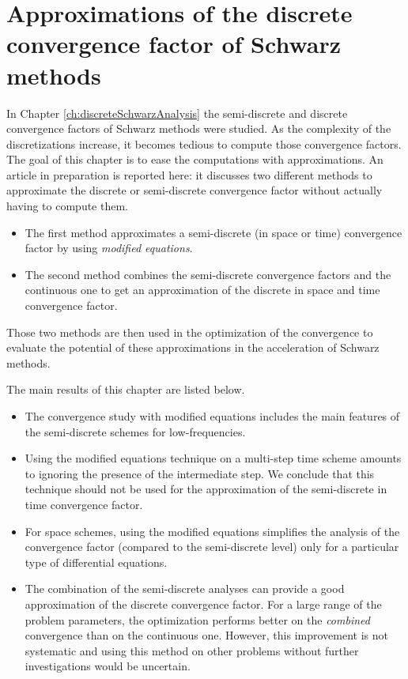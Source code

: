 \chapter{Approximations of the discrete convergence factor of Schwarz methods }
\label{ch:approximatedDiscreteSchwarz}
\minitoc
In Chapter \ref{ch:discreteSchwarzAnalysis} the semi-discrete and
discrete convergence factors of Schwarz methods were studied.
As the complexity of the discretizations increase, it becomes
tedious to compute those convergence factors.
The goal of this chapter
is to ease the computations with approximations.
An article in preparation is reported here:
it discusses two different methods to approximate the discrete
or semi-discrete convergence factor without actually having to
compute them.
\begin{itemize}
\item The first method approximates a semi-discrete
(in space or time) convergence factor by using
\textit{modified equations}.
\item The second method combines the semi-discrete convergence
factors and the continuous one to get an approximation of the
discrete in space and time convergence factor.
\end{itemize}
Those two methods are then used in the optimization of the
convergence to evaluate the potential of these approximations
in the acceleration of Schwarz methods.
\par
The main results of this chapter are listed below.
\begin{itemize}
\item The convergence study with modified equations
	includes the main features of the semi-discrete
		schemes for low-frequencies.
\item Using the modified equations technique
	on a multi-step time scheme amounts to ignoring
	the presence of the intermediate step. We conclude
	that this technique should not be used for
	the approximation of the semi-discrete in time
	convergence factor.
\item For space schemes, using the modified equations simplifies
	the analysis of the convergence factor
	(compared to the semi-discrete level) only
	for a particular type of differential equations.
\item The combination of the semi-discrete analyses can provide
	a good approximation of the discrete convergence factor.
	For a large range of the problem parameters,
	the optimization performs better on the \textit{combined}
	convergence than on the continuous one. However,
	this improvement is not systematic and using this method
	on other problems without further investigations
	would be uncertain.
\end{itemize}

